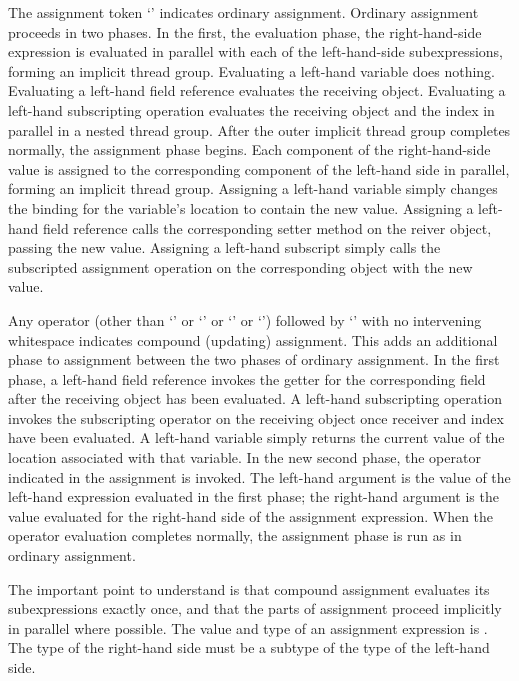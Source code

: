 The assignment token `\EXP{\ASSIGN}' indicates ordinary assignment.
Ordinary assignment proceeds in two phases.  In the first, the evaluation phase, the
right-hand-side expression is evaluated in parallel with each of the
left-hand-side subexpressions, forming an implicit thread group.
Evaluating a left-hand variable does nothing.  Evaluating a left-hand
field reference evaluates the receiving object.  Evaluating a
left-hand subscripting operation evaluates the receiving object and
the index in parallel in a nested thread group.  After the outer
implicit thread group completes normally, the assignment phase begins.  Each component of the right-hand-side value is
assigned to the corresponding component of the left-hand side in
parallel, forming an implicit thread group.  Assigning a left-hand
variable simply changes the binding for the variable's location to
contain the new value.
Assigning a left-hand field reference calls
the corresponding setter method on the reiver object, passing the new value.
Assigning a left-hand subscript simply calls the subscripted
assignment operation on the corresponding object with the new value.

Any operator (other than `\EXP{\COLONOP}' or `\EXP{=}' or `\EXP{<}' or
`\EXP{>}') followed by `\EXP{=}' with no intervening whitespace
indicates compound (updating) assignment.  This adds an additional
phase to assignment between the two phases of ordinary assignment.
In the first phase, a
left-hand field reference invokes the getter for
the corresponding field after the receiving object has been evaluated.
A left-hand subscripting operation invokes the subscripting operator
on the receiving object once receiver and index have been evaluated.  A
left-hand variable simply returns the current value of the location
associated with that variable.  In the new second phase, the operator
indicated in the assignment is invoked.  The left-hand argument is the
value of the left-hand expression evaluated in the first phase; the
right-hand argument is the value evaluated for the right-hand side of
the assignment expression.  When the operator evaluation completes
normally, the assignment phase is run as in ordinary assignment.

The important point to understand is that compound assignment evaluates
its subexpressions exactly once, and that the parts of assignment
proceed implicitly in parallel where possible.
The value and type of an assignment expression is \EXP{()}.
The type of the right-hand side must be a subtype of the type of the left-hand
side.

